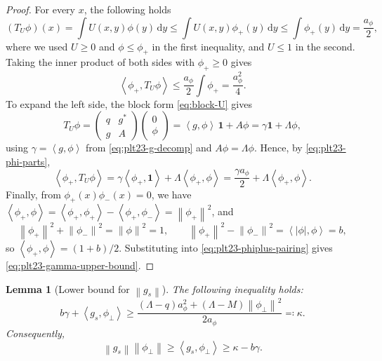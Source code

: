 \documentclass[11pt]{article}
\newtheorem{lemma}[theorem]{Lemma}
\numberwithin{equation}{section}
\newcommand{\one}{\mathbf 1}
\newcommand{\ip}[2]{\left\langle #1,#2\right\rangle}
\newcommand{\norm}[1]{\left\lVert #1\right\rVert}
\newcommand{\dd}{\,\mathrm d}
\begin{document}
\begin{proof}
  For every $x$, the following holds
  \[
    (T_U \phi)(x) = \int U(x, y) \phi(y) \dd y \le \int U(x, y) \phi_+(y) \dd y \le \int \phi_+(y) \dd y = \frac{a_\phi}{2},
  \]
  where we used $U \ge 0$ and $\phi \le \phi_+$ in the first inequality, and $U \le 1$ in the second.
  Taking the inner product of both sides with $\phi_+\ge0$ gives
  \begin{equation}\label{eq:plt23-phiplus-pairing}
    \ip{\phi_+}{T_U\phi}
    \le\frac{a_\phi}{2}\int\phi_+
    =\frac{a_\phi^2}{4}.
  \end{equation}
  To expand the left side, the block form \eqref{eq:block-U} gives
  \[
    T_U\phi=\begin{pmatrix}
      q & g^* \\
      g & A
    \end{pmatrix} \begin{pmatrix}
      0 \\ \phi
    \end{pmatrix}=\ip g\phi\,\one+A\phi=\gamma\one+\Lambda\phi,
  \]
  using $\gamma=\ip g\phi$ from \eqref{eq:plt23-g-decomp} and $A\phi=\Lambda\phi$.
  Hence, by \eqref{eq:plt23-phi-parts},
  \[
    \ip{\phi_+}{T_U\phi}
    =\gamma\ip{\phi_+}\one+\Lambda\ip{\phi_+}\phi
    =\frac{\gamma a_\phi}{2}+\Lambda\ip{\phi_+}\phi.
  \]
  Finally, from $\phi_+(x) \phi_-(x) = 0$, we have $\ip{\phi_+}\phi=\ip{\phi_+}{\phi_+} - \ip{\phi_+}{\phi_-} = \norm{\phi_+}^2$, and
  \[
    \norm{\phi_+}^2+\norm{\phi_-}^2=\norm\phi^2=1,
    \qquad
    \norm{\phi_+}^2-\norm{\phi_-}^2=\ip{|\phi|}\phi=b,
  \]
  so $\ip{\phi_+}\phi=(1+b)/2$.
  Substituting into \eqref{eq:plt23-phiplus-pairing} gives \eqref{eq:plt23-gamma-upper-bound}.
\end{proof}

\begin{lemma}[Lower bound for $\norm{g_s}$]\label{lem:plt23-gs-lower-bound}
  The following inequality holds:
  \begin{equation}\label{eq:plt23-gs-inner-lower}
    b\gamma+\ip{g_s}{\phi_\perp}
    \ge\frac{(\Lambda-q)a_\phi^2+(\Lambda-M)\norm{\phi_\perp}^2}{2a_\phi}
    \eqqcolon\kappa.
  \end{equation}
  Consequently,
  \begin{equation}\label{eq:plt23-gs-norm-lower}
    \norm{g_s}\norm{\phi_\perp}\ge \ip{g_s}{\phi_\perp}\ge\kappa-b\gamma.
  \end{equation}
\end{lemma}
\end{document}
